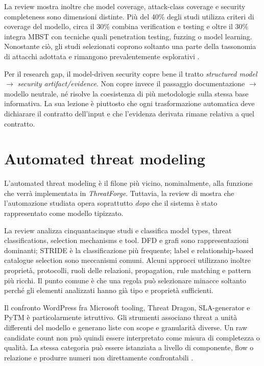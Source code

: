 \documentclass[12pt,a4paper,oneside]{report}
\newcommand{\threatforge}{\textit{ThreatForge}}
\begin{document}
La review mostra inoltre che model coverage, attack-class coverage e security completeness sono dimensioni distinte. Più del 40\% degli studi utilizza criteri di coverage del modello, circa il 30\% combina verification e testing e oltre il 30\% integra MBST con tecniche quali penetration testing, fuzzing o model learning. Nonostante ciò, gli studi selezionati coprono soltanto una parte della tassonomia di attacchi adottata e rimangono prevalentemente esplorativi \citep{lonetti2023mbstiot}.

Per il research gap, il model-driven security copre bene il tratto \textit{structured model} $\rightarrow$ \textit{security artifact/evidence}. Non copre invece il passaggio documentazione $\rightarrow$ modello neutrale, né risolve la coesistenza di più metodologie sulla stessa base informativa. La sua lezione è piuttosto che ogni trasformazione automatica deve dichiarare il contratto dell'input e che l'evidenza derivata rimane relativa a quel contratto.

\section{Automated threat modeling}

L'automated threat modeling è il filone più vicino, nominalmente, alla funzione che verrà implementata in \threatforge{}. Tuttavia, la review di \citet{granata2024automatedthreatmodelling} mostra che l'automazione studiata opera soprattutto \emph{dopo} che il sistema è stato rappresentato come modello tipizzato.

La review analizza cinquantacinque studi e classifica model types, threat classifications, selection mechanisms e tool. DFD e grafi sono rappresentazioni dominanti; STRIDE è la classificazione più frequente; label e relationship-based catalogue selection sono meccanismi comuni. Alcuni approcci utilizzano inoltre proprietà, protocolli, ruoli delle relazioni, propagation, rule matching e pattern più ricchi. Il punto comune è che una regola può selezionare minacce soltanto perché gli elementi analizzati hanno già tipo e proprietà sufficienti.

Il confronto WordPress fra Microsoft tooling, Threat Dragon, SLA-generator e PyTM è particolarmente istruttivo. Gli strumenti associano threat a unità differenti del modello e generano liste con scope e granularità diverse. Un raw candidate count non può quindi essere interpretato come misura di completezza o qualità. La stessa categoria può essere istanziata a livello di componente, flow o relazione e produrre numeri non direttamente confrontabili \citep{granata2024automatedthreatmodelling}.
\end{document}
